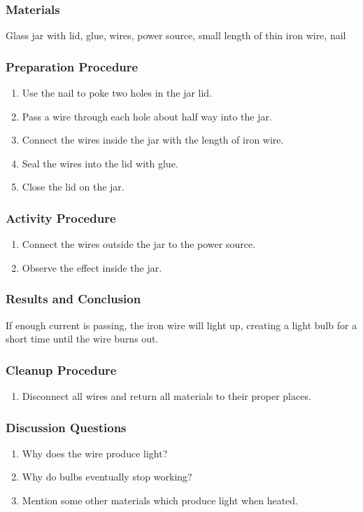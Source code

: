 \subsubsection*{Materials}
Glass jar with lid, glue, wires, power source, small length of thin iron wire, nail

\subsubsection*{Preparation Procedure}
\begin{enumerate}
\item{Use the nail to poke two holes in the jar lid.}
\item{Pass a wire through each hole about half way into the jar.}
\item{Connect the wires inside the jar with the length of iron wire.}
\item{Seal the wires into the lid with glue.}
\item{Close the lid on the jar.}
\end{enumerate}

\subsubsection*{Activity Procedure}
\begin{enumerate}
\item{Connect the wires outside the jar to the power source.}
\item{Observe the effect inside the jar.}
\end{enumerate}

\subsubsection*{Results and Conclusion}
If enough current is passing, the iron wire will light up, creating a light bulb for a short time until the
wire burns out.  

\subsubsection*{Cleanup Procedure}
\begin{enumerate}
\item{Disconnect all wires and return all materials to their proper places.}
\end{enumerate}

\subsubsection*{Discussion Questions}
\begin{enumerate}
\item{Why does the wire produce light?}
\item{Why do bulbs eventually stop working?}
\item{Mention some other materials which produce light when heated.}
\end{enumerate}

